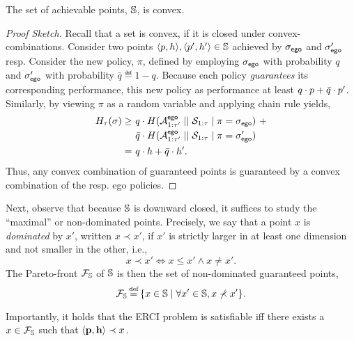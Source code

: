 \begin{proposition}
  The set of achievable points, $\mathbb{S}$, is convex. 
\end{proposition}
\begin{proof}[Proof Sketch]
  Recall that a set is convex, if it is closed under
  convex-combinations\footnotemark. Consider two points
  $\langle p, h \rangle, \langle p', h' \rangle \in
  \mathbb{S}$ achieved by ${\sigma_{\mathsf{ego}}}$ and ${\sigma'_{\mathsf{ego}}}$
  resp. Consider the new policy, $\pi$, defined by employing
  ${\sigma_{\mathsf{ego}}}$ with probability $q$ and ${\sigma'_{\mathsf{ego}}}$ with
  probability $\bar{q} \eqdef 1 - q$.  Because each policy
  \emph{guarantees} its corresponding performance, this new policy as
  performance at least $q\cdot p + \bar{q}\cdot p'$.  Similarly,
  by viewing $\pi$ as a random variable and applying chain rule
  yields,
  \begin{equation}
    \begin{split}
      H_\tau(\sigma)
      \geq &~q \cdot H( {\mathcal{A}}^{\mathsf{ego}}_{1:\tau'} \mid\mid {\mathcal{S}}_{1:\tau} \mid \pi={\sigma_{\mathsf{ego}}})~+\\
      &~\bar{q}  \cdot H( {\mathcal{A}}^{\mathsf{ego}}_{1:\tau'} \mid\mid {\mathcal{S}}_{1:\tau} \mid \pi={\sigma'_{\mathsf{ego}}})\\
      =&~q\cdot h + \bar{q}\cdot h'.
    \end{split}
  \end{equation}
  Thus, any convex combination of guaranteed points is guaranteed by
  a convex combination of the resp. ego policies.
\end{proof}

Next, observe that because $\mathbb{S}$ is downward closed, it
suffices to study the ``maximal'' or non-dominated points.  Precisely,
we say that a point $x$ is \emph{dominated} by $x'$, written $x \prec
x'$, if $x'$ is strictly larger in at least one dimension and not
smaller in the other, i.e., 
\begin{equation}
x \prec x' \iff x \leq x' \wedge x \neq x'.
\end{equation}
The Pareto-front $\mathcal{F}_{\mathbb{S}}$ of $\mathbb{S}$ is then the set of non-dominated guaranteed points,
\begin{equation}
  \pareto{\solutions} \eqdef \{ x \in \solutions \mid \forall x' \in \solutions, x \not\prec x'  \}.  
\end{equation}
\noindent
\begin{mdframed}
Importantly, it holds that the ERCI problem is satisfiable iff there exists a  $x \in \mathcal{F}_{\mathbb{S}}$ such that $\langle \mathbf{p}, \mathbf{h} \rangle \prec x$.    
\end{mdframed}

